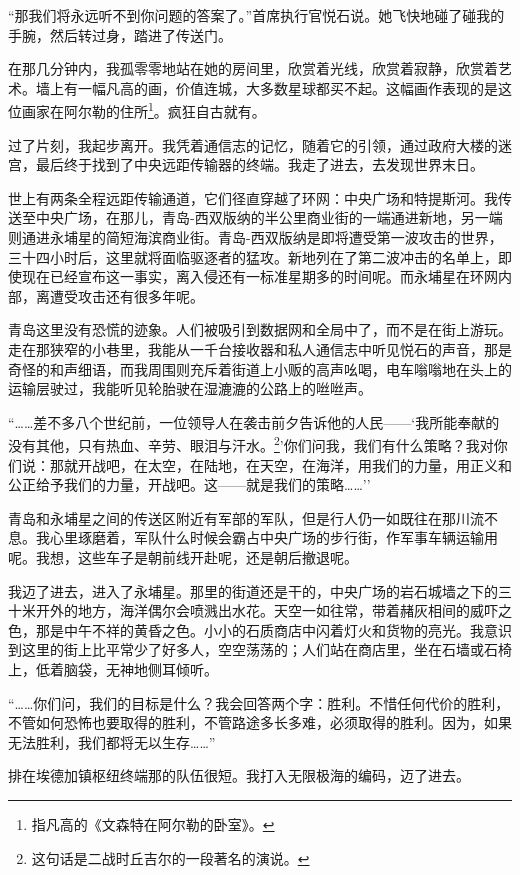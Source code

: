 \documentclass[AutoFakeBold=true]{book}
\begin{document}
``那我们将永远听不到你问题的答案了。''首席执行官悦石说。她飞快地碰了碰我的手腕，然后转过身，踏进了传送门。

在那几分钟内，我孤零零地站在她的房间里，欣赏着光线，欣赏着寂静，欣赏着艺术。墙上有一幅凡高的画，价值连城，大多数星球都买不起。这幅画作表现的是这位画家在阿尔勒的住所\footnote{指凡高的《文森特在阿尔勒的卧室》。}。疯狂自古就有。

过了片刻，我起步离开。我凭着通信志的记忆，随着它的引领，通过政府大楼的迷宫，最后终于找到了中央远距传输器的终端。我走了进去，去发现世界末日。

\vspace*{1em}

世上有两条全程远距传输通道，它们径直穿越了环网：中央广场和特提斯河。我传送至中央广场，在那儿，青岛-西双版纳的半公里商业街的一端通进新地，另一端则通进永埔星的简短海滨商业街。青岛-西双版纳是即将遭受第一波攻击的世界，三十四小时后，这里就将面临驱逐者的猛攻。新地列在了第二波冲击的名单上，即使现在已经宣布这一事实，离入侵还有一标准星期多的时间呢。而永埔星在环网内部，离遭受攻击还有很多年呢。

青岛这里没有恐慌的迹象。人们被吸引到数据网和全局中了，而不是在街上游玩。走在那狭窄的小巷里，我能从一千台接收器和私人通信志中听见悦石的声音，那是奇怪的和声细语，而我周围则充斥着街道上小贩的高声吆喝，电车嗡嗡地在头上的运输层驶过，我能听见轮胎驶在湿漉漉的公路上的咝咝声。

``……差不多八个世纪前，一位领导人在袭击前夕告诉他的人民——`我所能奉献的没有其他，只有热血、辛劳、眼泪与汗水。\footnote{这句话是二战时丘吉尔的一段著名的演说。}'你们问我，我们有什么策略？我对你们说：那就开战吧，在太空，在陆地，在天空，在海洋，用我们的力量，用正义和公正给予我们的力量，开战吧。这——就是我们的策略……''

青岛和永埔星之间的传送区附近有军部的军队，但是行人仍一如既往在那川流不息。我心里琢磨着，军队什么时候会霸占中央广场的步行街，作军事车辆运输用呢。我想，这些车子是朝前线开赴呢，还是朝后撤退呢。

我迈了进去，进入了永埔星。那里的街道还是干的，中央广场的岩石城墙之下的三十米开外的地方，海洋偶尔会喷溅出水花。天空一如往常，带着赭灰相间的威吓之色，那是中午不祥的黄昏之色。小小的石质商店中闪着灯火和货物的亮光。我意识到这里的街上比平常少了好多人，空空荡荡的；人们站在商店里，坐在石墙或石椅上，低着脑袋，无神地侧耳倾听。

``……你们问，我们的目标是什么？我会回答两个字：胜利。不惜任何代价的胜利，不管如何恐怖也要取得的胜利，不管路途多长多难，必须取得的胜利。因为，如果无法胜利，我们都将无以生存……''

排在埃德加镇枢纽终端那的队伍很短。我打入无限极海的编码，迈了进去。
\end{document}
